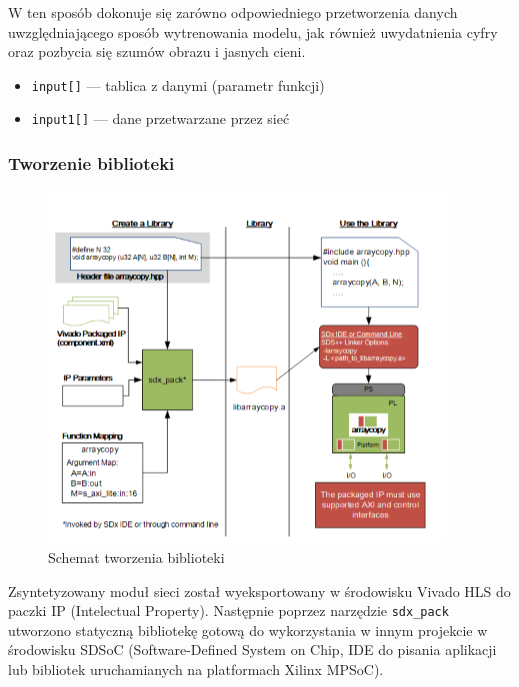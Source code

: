 \documentclass[12pt, oneside, a4paper]{article}
\begin{document}
W ten sposób dokonuje się zarówno odpowiedniego przetworzenia danych
uwzględniającego sposób wytrenowania modelu, jak również uwydatnienia
cyfry oraz pozbycia się szumów obrazu i jasnych cieni.

\hspace{-1cm}
\begin{minipage}{\linewidth}

\begin{itemize}
  \setlength{\itemindent}{3em}
  \item \lstinline[style=hls]{input[]} --- tablica z danymi (parametr funkcji)
  \item \lstinline[style=hls]{input1[]} --- dane przetwarzane przez sieć
\end{itemize}
\end{minipage}

\subsubsection{Tworzenie biblioteki}
\begin{figure}[h]
  \centering
  \includegraphics[scale=0.7]{figures/c-call.png}
  \caption{Schemat tworzenia biblioteki}\label{fig:ccall}
\end{figure}
Zsyntetyzowany moduł sieci został wyeksportowany w środowisku Vivado HLS
do paczki IP (Intelectual Property). Następnie poprzez narzędzie
\lstinline{sdx_pack} utworzono statyczną bibliotekę gotową do wykorzystania
w innym projekcie w środowisku SDSoC (Software-Defined System on Chip,
IDE do pisania aplikacji lub bibliotek uruchamianych na platformach
Xilinx MPSoC).
\end{document}
